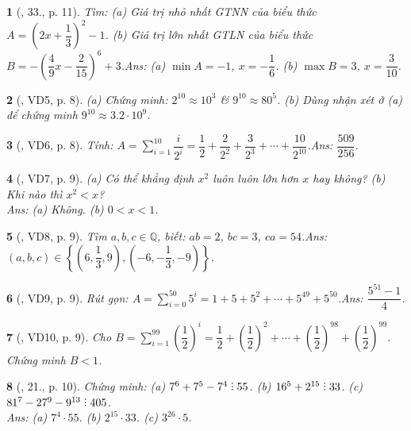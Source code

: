 \documentclass{article}
\newtheorem{baitoan}{}
\DeclareRobustCommand{\divby}{%
	\mathrel{\vbox{\baselineskip.65ex\lineskiplimit0pt\hbox{.}\hbox{.}\hbox{.}}}%
}
\begin{document}
\begin{baitoan}[\cite{Tuyen_Toan_7}, 33., p. 11]
	Tìm: (a) Giá trị nhỏ nhất {\rm GTNN} của biểu thức $A = \left(2x + \dfrac{1}{3}\right)^2 - 1$. (b) Giá trị lớn nhất {\rm GTLN} của biểu thức $B = -\left(\dfrac{4}{9}x - \dfrac{2}{15}\right)^6 + 3$.\hfill{\sf Ans: (a) $\min A = -1$, $x = -\dfrac{1}{6}$. (b) $\max B = 3$, $x = \dfrac{3}{10}$.}
\end{baitoan}

\begin{baitoan}[\cite{Binh_Toan_7_tap_1}, VD5, p. 8]
	(a) Chứng minh: $2^{10}\approx 10^3$ \& $9^{10}\approx 80^5$. (b) Dùng nhận xét ở (a) để chứng minh $9^{10}\approx 3.2\cdot 10^9$.	
\end{baitoan}

\begin{baitoan}[\cite{Binh_Toan_7_tap_1}, VD6, p. 8]
	Tính: $A = \sum_{i=1}^{10} \dfrac{i}{2^i} = \dfrac{1}{2} + \dfrac{2}{2^2} + \dfrac{3}{2^3} + \cdots + \dfrac{10}{2^{10}}$.\hfill{\sf Ans: $\dfrac{509}{256}$.}
\end{baitoan}

\begin{baitoan}[\cite{Binh_Toan_7_tap_1}, VD7, p. 9]
	(a) Có thể khẳng định $x^2$ luôn luôn lớn hơn $x$ hay không? (b) Khi nào thì $x^2 < x$?\\\mbox{}\hfill{\sf Ans: (a) Không. (b) $0 < x < 1$.}
\end{baitoan}

\begin{baitoan}[\cite{Binh_Toan_7_tap_1}, VD8, p. 9]
	Tìm $a,b,c\in\mathbb{Q}$, biết: $ab = 2$, $bc = 3$, $ca = 54$.\hfill{\sf Ans: $(a,b,c)\in\left\{\left(6,\dfrac{1}{3},9\right),\left(-6,-\dfrac{1}{3},-9\right)\right\}$.}
\end{baitoan}

\begin{baitoan}[\cite{Binh_Toan_7_tap_1}, VD9, p. 9]
	Rút gọn: $A = \sum_{i=0}^{50} 5^i = 1 + 5 + 5^2 + \cdots + 5^{49} + 5^{50}$.\hfill{\sf Ans: $\dfrac{5^{51} - 1}{4}$.}
\end{baitoan}

\begin{baitoan}[\cite{Binh_Toan_7_tap_1}, VD10, p. 9]
	Cho $B = \sum_{i=1}^{99} \left(\dfrac{1}{2}\right)^i = \dfrac{1}{2} + \left(\dfrac{1}{2}\right)^2 + \cdots + \left(\dfrac{1}{2}\right)^{98} + \left(\dfrac{1}{2}\right)^{99}$. Chứng minh $B < 1$.
\end{baitoan}

\begin{baitoan}[\cite{Binh_Toan_7_tap_1}, 21., p. 10]
	Chứng minh: (a) $7^6 + 7^5 - 7^4\divby 55$. (b) $16^5 + 2^{15}\divby 33$. (c) $81^7 - 27^9 - 9^{13}\divby 405$.\\\mbox{}\hfill{\sf Ans: (a) $7^4\cdot 55$. (b) $2^{15}\cdot 33$. (c) $3^{26}\cdot 5$.}
\end{baitoan}
\end{document}
